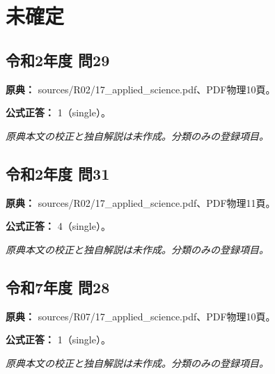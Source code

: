 \section{未確定}

\subsection{令和2年度 問29}
\label{q:r02-reg-applied-29}

\noindent\textbf{原典：} sources/R02/17\_applied\_science.pdf、PDF物理10頁。

\textbf{公式正答：} 1（single）。

\par\textit{原典本文の校正と独自解説は未作成。分類のみの登録項目。}

\subsection{令和2年度 問31}
\label{q:r02-reg-applied-31}

\noindent\textbf{原典：} sources/R02/17\_applied\_science.pdf、PDF物理11頁。

\textbf{公式正答：} 4（single）。

\par\textit{原典本文の校正と独自解説は未作成。分類のみの登録項目。}

\subsection{令和7年度 問28}
\label{q:r07-reg-applied-28}

\noindent\textbf{原典：} sources/R07/17\_applied\_science.pdf、PDF物理10頁。

\textbf{公式正答：} 1（single）。

\par\textit{原典本文の校正と独自解説は未作成。分類のみの登録項目。}
